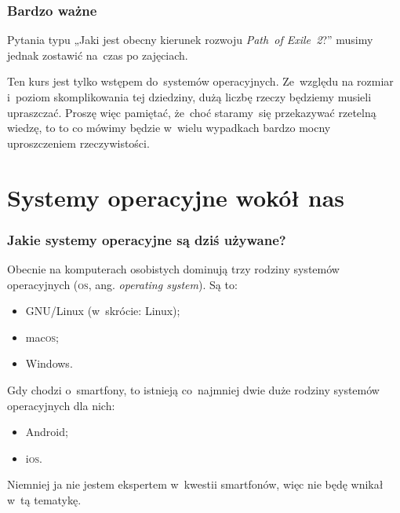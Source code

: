 \documentclass[10pt,t]{beamer}
\begin{document}
\begin{frame}
  \frametitle{Bardzo ważne}


  Pytania typu „Jaki jest obecny kierunek rozwoju \textit{Path~of
    Exile~2}?” musimy jednak zostawić na~czas po zajęciach.

  Ten kurs jest tylko \alert{wstępem} do~systemów operacyjnych. Ze~względu
  na rozmiar i~poziom skomplikowania tej dziedziny, dużą liczbę rzeczy
  będziemy musieli \alert{upraszczać}. Proszę więc pamiętać, że~choć
  staramy~się przekazywać rzetelną wiedzę, to to co mówimy będzie w~wielu
  wypadkach bardzo mocny uproszczeniem rzeczywistości.

\end{frame}










\section{Systemy operacyjne wokół nas}


\begin{frame}
  \frametitle{Jakie systemy operacyjne są dziś używane?}


  Obecnie na komputerach osobistych dominują trzy rodziny systemów
  operacyjnych (\textsc{os}, ang. \textit{operating system}). Są to:
  \begin{itemize}

  \item GNU/Linux (w~skrócie: Linux);

  \item mac\textsc{os};

  \item Windows.

  \end{itemize}

  Gdy chodzi o~smartfony, to istnieją co~najmniej dwie duże rodziny systemów
  operacyjnych dla nich:
  \begin{itemize}

  \item Android;

  \item i\textsc{os}.

  \end{itemize}
  Niemniej ja nie jestem ekspertem w~kwestii smartfonów, więc nie będę
  wnikał w~tą tematykę.


\end{frame}
\end{document}
